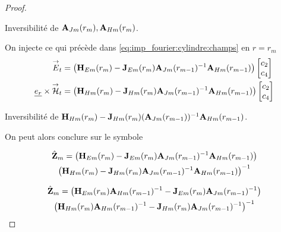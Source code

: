 \begin{proof}
            \begin{TODO}
  Inversibilité de \(\mathbf{A}_{Jm}(r_m), \mathbf{A}_{Hm}(r_m)\).
\end{TODO}

            On injecte ce qui précède dans \eqref{eq:imp_fourier:cylindre:champs} en \(r = r_{m}\)
            \begin{align}
                {\overset{\rightarrow}{E}}_t &= 
                \left(\mathbf{H}_{Em}(r_{m}) - \mathbf{J}_{Em}(r_{m})\mathbf{A}_{Jm}(r_{m-1})^{-1}\mathbf{A}_{Hm}(r_{m-1})\right)
                \begin{bmatrix}
                    c_2 \\
                    c_4
                \end{bmatrix}
                \\
                \underline{e_r}\times{\overset{\rightarrow}{\mathcal{H}}}_t &= 
                \left(\mathbf{H}_{Hm}(r_{m}) - \mathbf{J}_{Hm}(r_{m})\mathbf{A}_{Jm}(r_{m-1})^{-1}\mathbf{A}_{Hm}(r_{m-1}) \right)
                \begin{bmatrix}
                    c_2 \\
                    c_4
                \end{bmatrix}
            \end{align}

            \begin{TODO}
  Inversibilité de \(\mathbf{H}_{Hm}(r_m) - \mathbf{J}_{Hm}(r_m)(\mathbf{A}_{Jm}(r_{m-1}))^{-1}\mathbf{A}_{Hm}(r_{m-1})\).
\end{TODO}

            On peut alors conclure sur le symbole

            \begin{multline}
                \hat {\mathbf{Z}}_{m} = 
                    \left(\mathbf{H}_{Em}(r_m) - \mathbf{J}_{Em}(r_m)\mathbf{A}_{Jm}(r_{m-1})^{-1}\mathbf{A}_{Hm}(r_{m-1})\right) \\
                    \left(\mathbf{H}_{Hm}(r_m) - \mathbf{J}_{Hm}(r_m)\mathbf{A}_{Jm}(r_{m-1})^{-1}\mathbf{A}_{Hm}(r_{m-1})\right)^{-1}
            \end{multline}

            \begin{multline}
                \hat {\mathbf{Z}}_{m} =
                    \left(\mathbf{H}_{Em}(r_m)\mathbf{A}_{Hm}(r_{m-1})^{-1} - \mathbf{J}_{Em}(r_m)\mathbf{A}_{Jm}(r_{m-1})^{-1}\right) \\
                    \left(\mathbf{H}_{Hm}(r_m)\mathbf{A}_{Hm}(r_{m-1})^{-1} - \mathbf{J}_{Hm}(r_m)\mathbf{A}_{Jm}(r_{m-1})^{-1}\right)^{-1}
            \end{multline}

        \end{proof}


